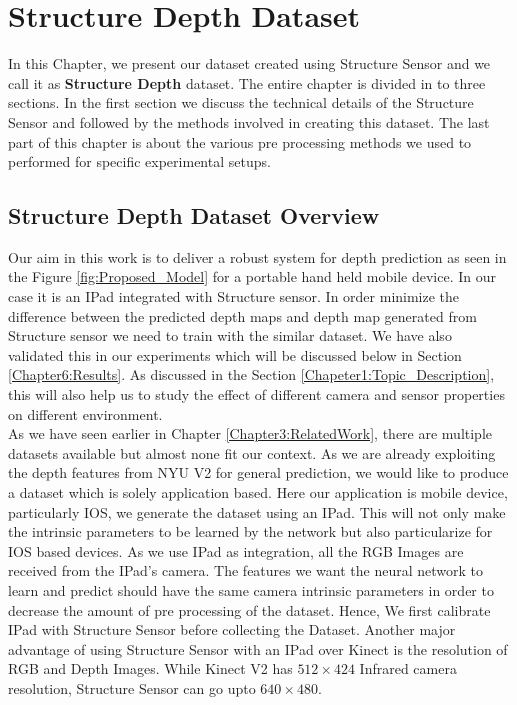 

\chapter{Structure Depth Dataset}

\label{Chapter4:Dataset} 


In this Chapter, we present our dataset created using Structure Sensor and we call it as \textbf{Structure Depth} dataset. The entire chapter is divided in to three sections. In the first section we discuss the technical details of the Structure Sensor and followed by the methods involved in creating this dataset. The last part of this chapter is about the various pre processing methods we used to performed for specific experimental setups.


\section{Structure Depth Dataset Overview} 

Our aim in this work is to deliver a robust system for depth prediction as seen in the Figure \ref{fig:Proposed_Model} for a portable hand held mobile device. In our case it is an IPad integrated with Structure sensor. In order minimize the difference between the predicted depth maps and depth map generated from Structure sensor we need to train with the similar dataset. We have also validated this in our experiments which will be discussed below in Section \ref{Chapter6:Results}. As discussed in the Section \ref{Chapeter1:Topic_Description}, this will also help us to study the effect of different camera and sensor properties on different environment.\\

As we have seen earlier in Chapter \ref{Chapter3:RelatedWork}, there are multiple datasets available but almost none fit our context. As we are already exploiting the depth features from NYU V2 for general prediction, we would like to produce a dataset which is solely application based. Here our application is mobile device, particularly IOS, we generate the dataset using an IPad. This will not only make the intrinsic parameters to be learned by the network but also particularize for IOS based devices. As we use IPad as integration, all the RGB Images are received from the IPad's camera. The features we want the neural network to learn and predict should have the same camera intrinsic parameters in order to decrease the amount of pre processing of the dataset. Hence, We first calibrate IPad with Structure Sensor before collecting the Dataset. Another major advantage of using Structure Sensor with an IPad over Kinect is the resolution of RGB and Depth Images. While Kinect V2 has $512\times424$ Infrared camera resolution, Structure Sensor can go upto $640\times480$. \\

